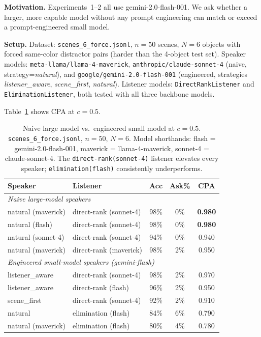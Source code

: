 \documentclass[11pt]{article}
\begin{document}
\textbf{Motivation.}
Experiments~1--2 all use gemini-2.0-flash-001.  We ask whether a larger, more
capable model without any prompt engineering can match or exceed a prompt-engineered
small model.

\textbf{Setup.}
Dataset: \texttt{scenes\_6\_force.jsonl}, $n{=}50$ scenes, $N{=}6$ objects with
forced same-color distractor pairs (harder than the 4-object test set).
Speaker models: \texttt{meta-llama/llama-4-maverick}, \texttt{anthropic/claude-sonnet-4}
(naive, strategy=\textit{natural}), and \texttt{google/gemini-2.0-flash-001}
(engineered, strategies \textit{listener\_aware}, \textit{scene\_first},
\textit{natural}).
Listener models: \texttt{DirectRankListener} and \texttt{EliminationListener}, both
tested with all three backbone models.

Table~\ref{tab:scale} shows CPA at $c{=}0.5$.

\begin{table}[ht]
\centering
\small
\begin{tabular}{p{3.2cm}p{3.4cm}ccc}
\toprule
Speaker & Listener & Acc & Ask\% & CPA \\
\midrule
\multicolumn{5}{l}{\textit{Naive large-model speakers}} \\
natural (maverick)  & direct-rank (sonnet-4) & 98\% & 0\% & \textbf{0.980} \\
natural (flash)     & direct-rank (sonnet-4) & 98\% & 0\% & \textbf{0.980} \\
natural (sonnet-4)  & direct-rank (sonnet-4) & 94\% & 0\% & 0.940 \\
natural (maverick)  & direct-rank (maverick) & 98\% & 2\% & 0.950 \\
\midrule
\multicolumn{5}{l}{\textit{Engineered small-model speakers (gemini-flash)}} \\
listener\_aware & direct-rank (sonnet-4) & 98\% & 2\% & 0.970 \\
listener\_aware & direct-rank (flash)    & 96\% & 2\% & 0.950 \\
scene\_first    & direct-rank (sonnet-4) & 92\% & 2\% & 0.910 \\
natural         & elimination (flash)    & 84\% & 6\% & 0.790 \\
natural (maverick) & elimination (flash) & 80\% & 4\% & 0.780 \\
\bottomrule
\end{tabular}
\caption{Naive large model vs.\ engineered small model at $c{=}0.5$.
         \texttt{scenes\_6\_force.jsonl}, $n{=}50$, $N{=}6$.
         Model shorthands: flash = gemini-2.0-flash-001, maverick = llama-4-maverick,
         sonnet-4 = claude-sonnet-4.
         The \texttt{direct-rank(sonnet-4)} listener elevates every speaker;
         \texttt{elimination(flash)} consistently underperforms.}
\label{tab:scale}
\end{table}
\end{document}
